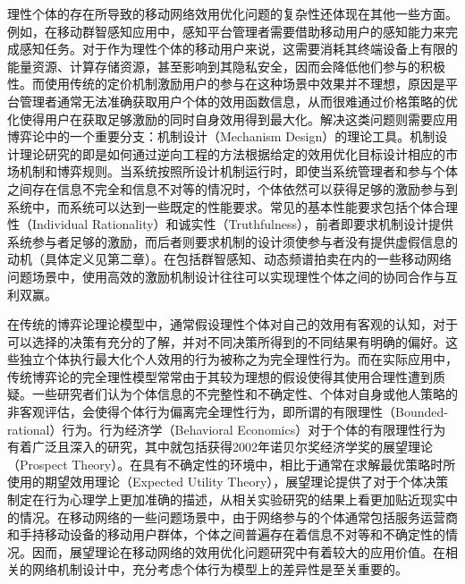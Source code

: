 理性个体的存在所导致的移动网络效用优化问题的复杂性还体现在其他一些方面。例如，在移动群智感知应用中，感知平台管理者需要借助移动用户的感知能力来完成感知任务。对于作为理性个体的移动用户来说，这需要消耗其终端设备上有限的能量资源、计算存储资源，甚至影响到其隐私安全，因而会降低他们参与的积极性。而使用传统的定价机制激励用户的参与在这种场景中效果并不理想，原因是平台管理者通常无法准确获取用户个体的效用函数信息，从而很难通过价格策略的优化使得用户在获取足够激励的同时自身效用得到最大化。解决这类问题则需要应用博弈论中的一个重要分支：机制设计（Mechanism Design）的理论工具\cite{Nisan07}。机制设计理论研究的即是如何通过逆向工程的方法根据给定的效用优化目标设计相应的市场机制和博弈规则。当系统按照所设计机制运行时，即使当系统管理者和参与个体之间存在信息不完全和信息不对等的情况时，个体依然可以获得足够的激励参与到系统中，而系统可以达到一些既定的性能要求。常见的基本性能要求包括个体合理性（Individual Rationality）和诚实性（Truthfulness），前者即要求机制设计提供系统参与者足够的激励，而后者则要求机制的设计须使参与者没有提供虚假信息的动机（具体定义见第二章）。在包括群智感知、动态频谱拍卖在内的一些移动网络问题场景中，使用高效的激励机制设计往往可以实现理性个体之间的协同合作与互利双赢。

在传统的博弈论理论模型中，通常假设理性个体对自己的效用有客观的认知，对于可以选择的决策有充分的了解，并对不同决策所得到的不同结果有明确的偏好。这些独立个体执行最大化个人效用的行为被称之为完全理性行为。而在实际应用中，传统博弈论的完全理性模型常常由于其较为理想的假设使得其使用合理性遭到质疑。一些研究者们认为个体信息的不完整性和不确定性、个体对自身或他人策略的非客观评估，会使得个体行为偏离完全理性行为，即所谓的有限理性（Bounded-rational）行为。行为经济学（Behavioral Economics）对于个体的有限理性行为有着广泛且深入的研究，其中就包括获得2002年诺贝尔奖经济学奖的展望理论（Prospect Theory）\cite{Kahneman}。在具有不确定性的环境中，相比于通常在求解最优策略时所使用的期望效用理论（Expected Utility Theory），展望理论提供了对于个体决策制定在行为心理学上更加准确的描述，从相关实验研究的结果上看更加贴近现实中的情况。在移动网络的一些问题场景中，由于网络参与的个体通常包括服务运营商和手持移动设备的移动用户群体，个体之间普遍存在着信息不对等和不确定性的情况。因而，展望理论在移动网络的效用优化问题研究中有着较大的应用价值。在相关的网络机制设计中，充分考虑个体行为模型上的差异性是至关重要的。


